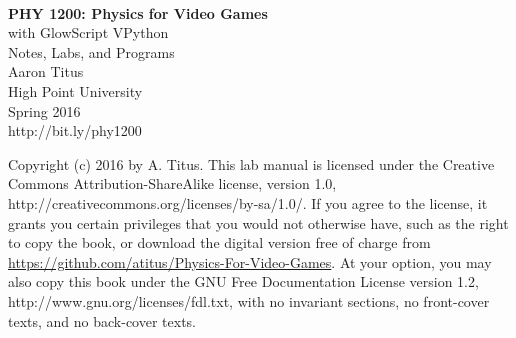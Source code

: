 \documentclass[10pt]{tituslab}
\begin{document}
\myeqnspacing %
\frontmatter
\yesiwantarabic
\frontmatter
\thispagestyle{empty}
\noindent\vspace{0mm}\\
\noindent\vspace{10mm}\hspace{1mm}\textsf{\textbf{\LARGE{PHY 1200: Physics for Video Games}}}\\
\noindent\vspace{4mm}\hspace{4in}\textsf{\Large{with GlowScript VPython}}\\
\noindent\vspace{4mm}\hspace{4in}\textsf{\Large{Notes, Labs, and Programs}}\\
\noindent\vspace{4mm}\hspace{4in}\textsf{\Large{Aaron Titus}}\\
\noindent\vspace{4mm}\hspace{4in}\textsf{\Large{High Point University}}\\
\noindent\vspace{4mm}\hspace{4in}\textsf{Spring 2016}\\
\noindent\vspace{4mm}\hspace{4in}\textsf{http://bit.ly/phy1200}
\yesiwantarabic
\mynormaltype

\pagebreak[4]
\noindent
Copyright (c) 2016 by A. Titus. This lab manual is
    licensed under the Creative Commons
    Attribution-ShareAlike license, version 1.0, 
    http://creativecommons.org/licenses/by-sa/1.0/.
    If you agree to the license, it grants you certain privileges that
    you would not otherwise have, such as the right to copy the book,
    or download the digital version free of charge from
    \href{https://github.com/atitus/Physics-For-Video-Games}{https://github.com/atitus/Physics-For-Video-Games}. At your option, you may also copy this book
    under the GNU Free Documentation License version 1.2, http://www.gnu.org/licenses/fdl.txt,
    with no invariant sections, no front-cover texts, and no back-cover texts.


\tableofcontents
\mainmatter
\startchaptersonleftpage
\addtocounter{page}{4} 
\parafmt
\myeqnspacing %
\end{document}
